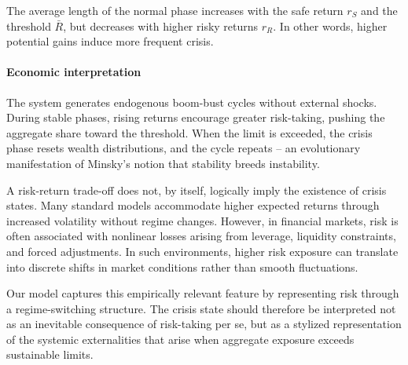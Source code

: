 \documentclass[11pt,a4paper]{article}
\begin{document}
The average length of the normal phase increases with the safe return $r_S$ and the threshold $\bar R$, but decreases with higher risky returns $r_R$. In other words, higher potential gains induce more frequent crisis. 

\paragraph{Economic interpretation} The system generates endogenous boom-bust cycles without external shocks. During stable phases, rising returns encourage greater risk-taking, pushing the aggregate share toward the threshold. When the limit is exceeded, the crisis phase resets wealth distributions, and the cycle repeats -- an evolutionary manifestation of Minsky's notion that stability breeds instability.


A risk-return trade-off does not, by itself, logically imply the existence of crisis states. Many standard models accommodate higher expected returns through increased volatility without regime changes. However, in financial markets, risk is often associated with nonlinear losses arising from leverage, liquidity constraints, and forced adjustments. In such environments, higher risk exposure can translate into discrete shifts in market conditions rather than smooth fluctuations.

Our model captures this empirically relevant feature by representing risk through a regime-switching structure. The crisis state should therefore be interpreted not as an inevitable consequence of risk-taking per se, but as a stylized representation of the systemic externalities that arise when aggregate exposure exceeds sustainable limits. 




\end{document}
